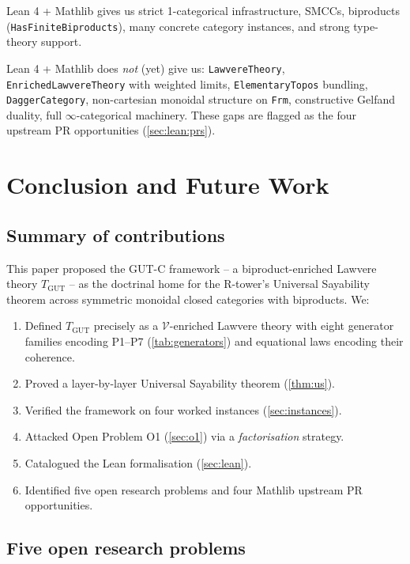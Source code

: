 \documentclass[11pt,a4paper]{article}
\theoremstyle{plain}
\theoremstyle{definition}
\theoremstyle{remark}
\newcommand{\TGUT}{T_{\mathrm{GUT}}}
\newcommand{\smcc}{SMCC}
\begin{document}
Lean 4 + Mathlib gives us strict 1-categorical infrastructure, \smcc{}s, biproducts (\texttt{HasFiniteBiproducts}), many concrete category instances, and strong type-theory support.

Lean 4 + Mathlib does \emph{not} (yet) give us: \texttt{LawvereTheory}, \texttt{EnrichedLawvereTheory} with weighted limits, \texttt{ElementaryTopos} bundling, \texttt{DaggerCategory}, non-cartesian monoidal structure on \texttt{Frm}, constructive Gelfand duality, full $\infty$-categorical machinery. These gaps are flagged as the four upstream PR opportunities (\cref{sec:lean:prs}).

\section{Conclusion and Future Work}\label{sec:concl}

\subsection{Summary of contributions}\label{sec:concl:summary}

This paper proposed the GUT-C framework -- a biproduct-enriched Lawvere theory $\TGUT$ -- as the doctrinal home for the R-tower's Universal Sayability theorem across symmetric monoidal closed categories with biproducts. We:

\begin{enumerate}[leftmargin=*]
\item Defined $\TGUT$ precisely as a $\mathcal{V}$-enriched Lawvere theory with eight generator families encoding P1--P7 (\cref{tab:generators}) and equational laws encoding their coherence.
\item Proved a layer-by-layer Universal Sayability theorem (\cref{thm:us}).
\item Verified the framework on four worked instances (\cref{sec:instances}).
\item Attacked Open Problem O1 (\cref{sec:o1}) via a \emph{factorisation} strategy.
\item Catalogued the Lean formalisation (\cref{sec:lean}).
\item Identified five open research problems and four Mathlib upstream PR opportunities.
\end{enumerate}

\subsection{Five open research problems}\label{sec:concl:open}
\end{document}
